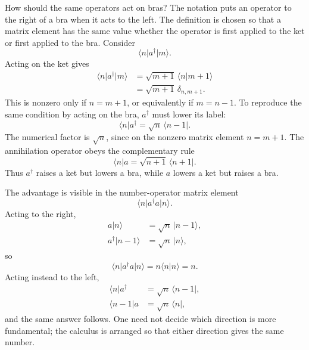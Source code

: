 How should the same operators act on bras? The notation puts an operator to the right of a bra when it acts to the left. The definition is chosen so that a matrix element has the same value whether the operator is first applied to the ket or first applied to the bra. Consider
\begin{equation}
\langle n\rvert a^\dagger\lvert m\rangle.
\end{equation}
Acting on the ket gives
\begin{align}
\langle n\rvert a^\dagger\lvert m\rangle
&=\sqrt{m+1}\,\langle n\vert m+1\rangle\\
&=\sqrt{m+1}\,\delta_{n,m+1}.
\end{align}
This is nonzero only if \(n=m+1\), or equivalently if \(m=n-1\). To reproduce the same condition by acting on the bra, \(a^\dagger\) must lower its label:
\begin{equation}
\langle n\rvert a^\dagger
=\sqrt n\,\langle n-1\rvert.
\end{equation}
The numerical factor is \(\sqrt n\), since on the nonzero matrix element \(n=m+1\). The annihilation operator obeys the complementary rule
\begin{equation}
\langle n\rvert a
=\sqrt{n+1}\,\langle n+1\rvert.
\end{equation}
Thus \(a^\dagger\) raises a ket but lowers a bra, while \(a\) lowers a ket but raises a bra.

The advantage is visible in the number-operator matrix element
\begin{equation}
\langle n\rvert a^\dagger a\lvert n\rangle.
\end{equation}
Acting to the right,
\begin{align}
a\lvert n\rangle&=\sqrt n\,\lvert n-1\rangle,\\
a^\dagger\lvert n-1\rangle&=\sqrt n\,\lvert n\rangle,
\end{align}
so
\begin{equation}
\langle n\rvert a^\dagger a\lvert n\rangle
=n\langle n\vert n\rangle=n.
\end{equation}
Acting instead to the left,
\begin{align}
\langle n\rvert a^\dagger&=\sqrt n\,\langle n-1\rvert,\\
\langle n-1\rvert a&=\sqrt n\,\langle n\rvert,
\end{align}
and the same answer follows. One need not decide which direction is more fundamental; the calculus is arranged so that either direction gives the same number.

